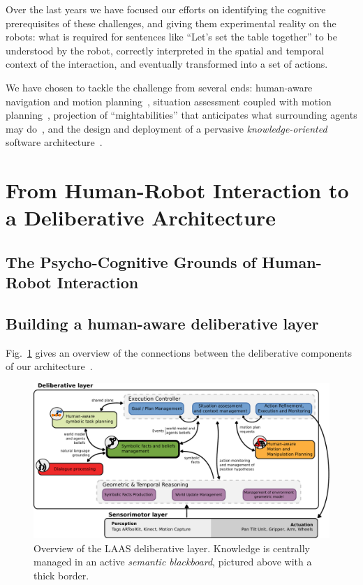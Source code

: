 \documentclass[preprint,5p]{elsarticle}
\begin{document}

Over the last years we have focused our efforts on identifying the cognitive
prerequisites of these challenges, and giving them experimental reality on the
robots: what is required for sentences like ``Let's set the table together''
to be understood by the robot, correctly interpreted in the spatial and
temporal context of the interaction, and eventually transformed into a set of
actions.

We have chosen to tackle the challenge from several ends: human-aware
navigation and motion planning~\cite{Mainprice2011}, situation assessment
coupled with motion planning~\cite{Mainprice2012}, projection of
``mightabilities'' that anticipates what surrounding agents may
do~\cite{Pandey2011}, and the design and deployment of a pervasive
\emph{knowledge-oriented} software architecture~\cite{Lemaignan2013}.

\section{From Human-Robot Interaction to a Deliberative Architecture}

\subsection{The Psycho-Cognitive Grounds of Human-Robot Interaction}
\label{sec:psychocognitivegrounds}


\subsection{Building a human-aware deliberative layer}


Fig.~\ref{fig|archi} gives an overview of the connections between the
deliberative components of our architecture~\cite{Alami2011}.

\begin{figure}
        \centering
        \includegraphics[width=1.0\columnwidth]{archi}
        \caption{Overview of the LAAS deliberative layer. Knowledge is
        centrally managed in an active \emph{semantic blackboard}, pictured
        above with a thick border.}
        \label{fig|archi}
\end{figure}
\end{document}
